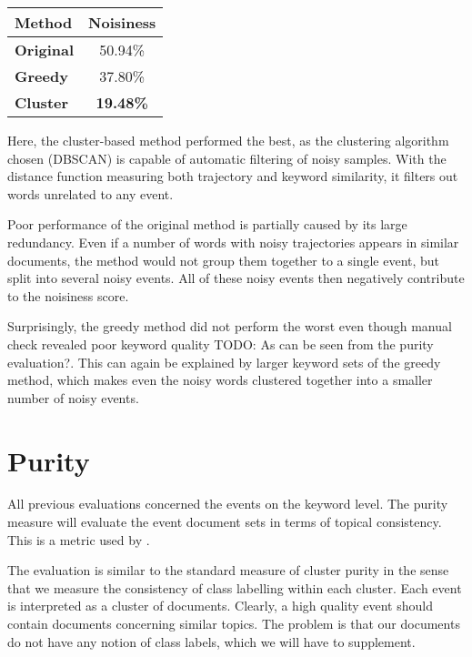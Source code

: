 \hspace{\fill}

\begin{minipage}{\linewidth}
\centering
\begin{tabular}{ l c }\toprule[1.5pt]
\bf Method 	 & \bf Noisiness \\ \midrule
\bf Original &  50.94\% \\
\bf Greedy   &  37.80\% \\
\bf Cluster &  \bf 19.48\% \\ \bottomrule[1.25pt]
\end {tabular}\par
{} \label{tab:title} 
\end{minipage}

\hspace{\fill}

Here, the cluster-based method performed the best, as the clustering algorithm chosen (DBSCAN) is capable of automatic filtering of noisy samples. With the distance function measuring both trajectory and keyword similarity, it filters out words unrelated to any event.

Poor performance of the original method is partially caused by its large redundancy. Even if a number of words with noisy trajectories appears in similar documents, the method would not group them together to a single event, but split into several noisy events. All of these noisy events then negatively contribute to the noisiness score.

Surprisingly, the greedy method did not perform the worst even though manual check revealed poor keyword quality {\color{red} TODO: As can be seen from the purity evaluation?}. This can again be explained by larger keyword sets of the greedy method, which makes even the noisy words clustered together into a smaller number of noisy events.

\section{Purity}

All previous evaluations concerned the events on the keyword level. The purity measure will evaluate the event document sets in terms of topical consistency. This is a metric used by \cite{document-purity}.

The evaluation is similar to the standard measure of cluster purity in the sense that we measure the consistency of class labelling within each cluster. Each event is interpreted as a cluster of documents. Clearly, a high quality event should contain documents concerning similar topics. The problem is that our documents do not have any notion of class labels, which we will have to supplement.


